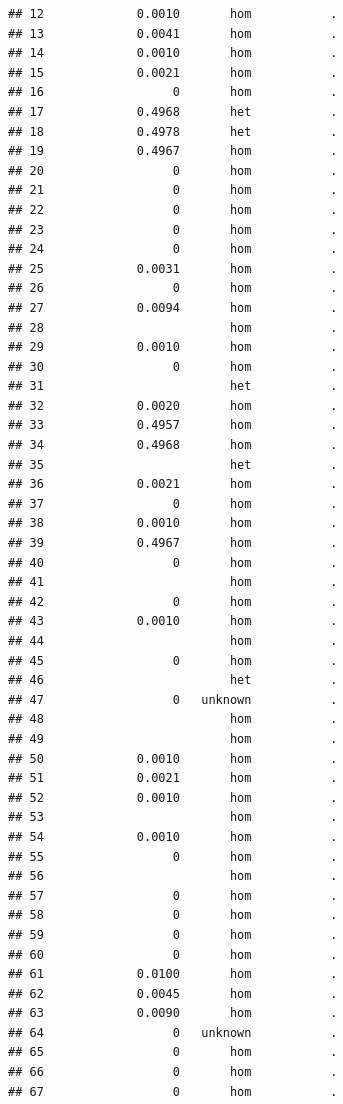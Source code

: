 \documentclass[
]{article}
\begin{document}
\begin{verbatim}
## 12             0.0010       hom           .
## 13             0.0041       hom           .
## 14             0.0010       hom           .
## 15             0.0021       hom           .
## 16                  0       hom           .
## 17             0.4968       het           .
## 18             0.4978       het           .
## 19             0.4967       hom           .
## 20                  0       hom           .
## 21                  0       hom           .
## 22                  0       hom           .
## 23                  0       hom           .
## 24                  0       hom           .
## 25             0.0031       hom           .
## 26                  0       hom           .
## 27             0.0094       hom           .
## 28                          hom           .
## 29             0.0010       hom           .
## 30                  0       hom           .
## 31                          het           .
## 32             0.0020       hom           .
## 33             0.4957       hom           .
## 34             0.4968       hom           .
## 35                          het           .
## 36             0.0021       hom           .
## 37                  0       hom           .
## 38             0.0010       hom           .
## 39             0.4967       hom           .
## 40                  0       hom           .
## 41                          hom           .
## 42                  0       hom           .
## 43             0.0010       hom           .
## 44                          hom           .
## 45                  0       hom           .
## 46                          het           .
## 47                  0   unknown           .
## 48                          hom           .
## 49                          hom           .
## 50             0.0010       hom           .
## 51             0.0021       hom           .
## 52             0.0010       hom           .
## 53                          hom           .
## 54             0.0010       hom           .
## 55                  0       hom           .
## 56                          hom           .
## 57                  0       hom           .
## 58                  0       hom           .
## 59                  0       hom           .
## 60                  0       hom           .
## 61             0.0100       hom           .
## 62             0.0045       hom           .
## 63             0.0090       hom           .
## 64                  0   unknown           .
## 65                  0       hom           .
## 66                  0       hom           .
## 67                  0       hom           .

\end{verbatim}
\end{document}

